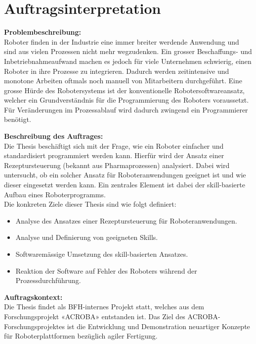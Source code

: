 \newpage
\section{Auftragsinterpretation} \label{Auftragsinterpretation}

	\textbf{Problembeschreibung:} \vspace{2mm} 
	\\
	Roboter finden in der Industrie eine immer breiter werdende Anwendung und sind aus vielen Prozessen
	nicht mehr wegzudenken. Ein grosser Beschaffungs- und Inbetriebnahmeaufwand machen es jedoch
	für viele Unternehmen schwierig, einen Roboter in ihre Prozesse zu integrieren. Dadurch werden
	zeitintensive und monotone Arbeiten oftmals noch manuell von Mitarbeitern durchgeführt. Eine grosse
	Hürde des Robotersystems ist der konventionelle Robotersoftwareansatz, welcher ein Grundverständnis
	für die Programmierung des Roboters voraussetzt. Für Veränderungen im Prozessablauf wird dadurch
	zwingend ein Programmierer benötigt.
	\vspace{3mm}
	
	\textbf{Beschreibung des Auftrages:} \vspace{2mm} 
	\\
	Die Thesis beschäftigt sich mit der Frage, wie ein Roboter einfacher und standardisiert programmiert
	werden kann. Hierfür wird der Ansatz einer Rezeptursteuerung (bekannt aus Pharmaprozessen)
	analysiert. Dabei wird untersucht, ob ein solcher Ansatz für Roboteranwendungen geeignet ist und wie
	dieser eingesetzt werden kann. Ein zentrales Element ist dabei der skill-basierte Aufbau eines
	Roboterprogramms.
	\\
	\linebreak
	Die konkreten Ziele dieser Thesis sind wie folgt definiert:
	\begin{itemize}
		\item Analyse des Ansatzes einer Rezeptursteuerung für Roboteranwendungen.
		\item Analyse und Definierung von geeigneten Skills.
		\item Softwaremässige Umsetzung des skill-basierten Ansatzes.
		\item Reaktion der Software auf Fehler des Roboters während der Prozessdurchführung.
	\end{itemize}
	\addvspace{5mm}
	
	\textbf{Auftragskontext:} \vspace{2mm} 
	\\
	Die Thesis findet als BFH-internes Projekt statt, welches aus dem Forschungsprojekt «ACROBA»
	entstanden ist. Das Ziel des ACROBA-Forschungsprojektes ist die Entwicklung und Demonstration neuartiger
	Konzepte für Roboterplattformen bezüglich agiler Fertigung.
	\vspace{3mm}
	

